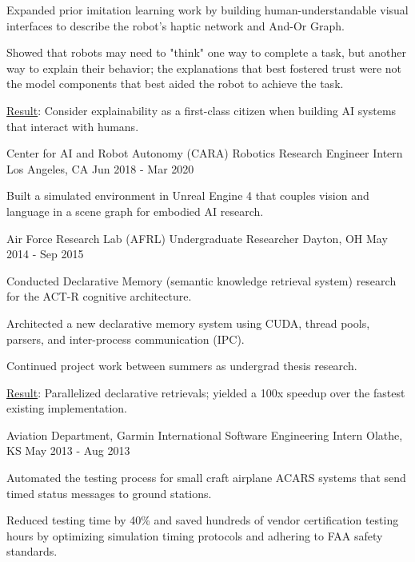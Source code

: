 \begin{cventries}
{\vspace{-1mm}
\begin{cvitems}
  \item Expanded prior imitation learning work by building human-understandable visual interfaces to describe the robot's haptic network and And-Or Graph.
  \item Showed that robots may need to "think" one way to complete a task, but another way to explain their behavior; the explanations that best fostered trust were not the model components that best aided the robot to achieve the task.
  \item \underline{Result}: Consider explainability as a first-class citizen when building AI systems that interact with humans.
\end{cvitems}
\fi
}

\ifresume\else
\cventry
{Center for AI and Robot Autonomy (CARA)}
{Robotics Research Engineer Intern}
{Los Angeles, CA}
{Jun 2018 - Mar 2020}
{
\begin{cvitems}
\item Built a simulated environment in Unreal Engine 4 that couples vision and language in a scene graph for embodied AI research.
\end{cvitems}
}
\fi

\cventry
{Air Force Research Lab (AFRL)}
{Undergraduate Researcher}
{Dayton, OH}
{May 2014 - Sep 2015}
{
\begin{cvitems}
\item Conducted Declarative Memory (semantic knowledge retrieval system) research for the ACT-R cognitive architecture.
\item Architected a new declarative memory system using CUDA, thread pools, parsers, and inter-process communication (IPC).
\item Continued project work between summers as undergrad thesis research.
\item \underline{Result}: Parallelized declarative retrievals; yielded a 100x speedup over the fastest existing implementation.
\end{cvitems}
}

\ifresume\else
\cventry
{Aviation Department, Garmin International}
{Software Engineering Intern}
{Olathe, KS}
{May 2013 - Aug 2013}
{
\begin{cvitems}
\item Automated the testing process for small craft airplane ACARS systems that send timed status messages to ground stations.
\item Reduced testing time by 40\% and saved hundreds of vendor certification testing hours by optimizing simulation timing protocols and adhering to FAA safety standards.
\end{cvitems}
}
\fi

\end{cventries}